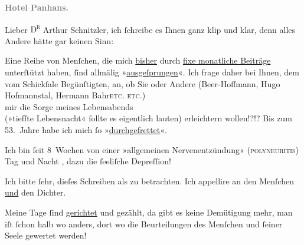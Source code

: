 \pstart
           \raggedleft{}\textcolor{gray}{\textbf{Hotel Panhans.}}\pend
           
\pstart{}Lieber \textsc{D\textsuperscript{r}} Arthur Schnitzler,\pend\vspace{0.5em}
\pstart
           ich{ }ſchreibe es Ihnen ganz klip und klar, denn alles Andere hätte gar keinen
               Sinn:\pend
           
\pstart
           Eine Reihe von Menſchen, die mich \uline{bisher} durch \uline{fixe monatliche Beiträge} unterſtützt haben,{ }ſind
               allmälig »\uline{ausgeſprungen}«. Ich frage daher bei Ihnen,
               dem vom Schickſale Begünſtigten, an, ob Sie oder Andere (Beer-Hoffmann, Hugo
                  Hofmannstal, Hermann Bahr\textsc{etc. etc.}) {\\}mir die Sorge meines
               Lebensabends{\\}(»tiefſte Lebensnacht«{ }ſollte es eigentlich lauten) erleichtern
               wollen!?!? \introOben{}Bis zum 53. Jahre habe ich mich{ }ſo »\uline{durchgefrettet}«.\introOben{}\pend
           
\pstart
           {\pb}Ich bin{ }ſeit 8 Wochen von einer
               »allgemeinen Nervenentzündung« (\textsc{polyneuritis}) Tag und Nacht
                  , dazu die{ }ſeeliſche Depreſſion!\pend
           
\pstart
           Ich bitte{ }ſehr, dieſes Schreiben als  zu
               betrachten. \introOben{}Ich appellire an den Menſchen \uline{und} den Dichter.\introOben{}\pend
           
\pstart
           Meine Tage{ }ſind \uline{gerichtet} und gezählt, da gibt es
               keine Demütigung mehr, man iſt{ }ſchon halb wo anders, dort wo die Beurteilungen des
               Menſchen und{ }ſeiner Seele  gewertet werden!\pend
           
